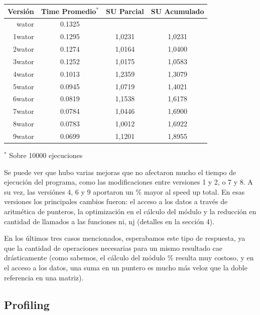 \documentclass[a4paper,10pt]{article}
\begin{document}
\begin{center}
  \begin{tabular}{| r | c | c | c |}
    \hline
    Versi\'on	&   Time Promedio$^*$  &	SU Parcial	& 	SU Acumulado	\\ \hline \hline
    wator	&	0.1325		&       		&			\\ \hline
    1wator	&	0.1295		&   	1,0231		&	1,0231		\\ \hline
    2wator	&	0.1274		&	1,0164		&	1,0400		\\ \hline
    3wator	&	0.1252		&	1,0175		&	1,0583		\\ \hline
    4wator	&	0.1013		&	1,2359		&	1,3079		\\ \hline
    5wator	&	0.0945		&	1,0719		&	1,4021		\\ \hline
    6wator	&	0.0819		&	1,1538		&	1,6178		\\ \hline
    7wator	&	0.0784		&	1,0446		&	1,6900		\\ \hline
    8wator	&	0.0783		&	1,0012		&	1,6922		\\ \hline
    9wator	&	0.0699		&	1,1201		&	1,8955		\\ \hline

  \end{tabular}
	
	\small{$^*$ Sobre 10000 ejecuciones}
	\end{center}

\bigskip

    Se puede ver que hubo varias mejoras que no afectaron mucho el tiempo de ejecuci\'on del programa, como las modificaciones entre versiones 1 y 2, o 7 y 8. A su vez, las versi\'ones 4, 6 y 9 aportaron un \% mayor al speed up total. En esas versiones los principales cambios fueron: el acceso a los datos a trav\'es de aritm\'etica de punteros, la optimizaci\'on en el c\'alculo del m\'odulo y la reducci\'on en cantidad de llamados a las funciones ni, nj (detalles en la secci\'on 4).
    
    En los \'ultimos tres casos mencionados, esperabamos este tipo de respuesta, ya que la cantidad de operaciones necesarias para un mismo resultado cae dr\'asticamente (como sabemos, el c\'alculo del m\'odulo \% resulta muy costoso, y en el acceso a los datos, una suma en un puntero es mucho m\'as veloz que la doble referencia en una matriz).  

\subsection{Profiling}
\end{document}
